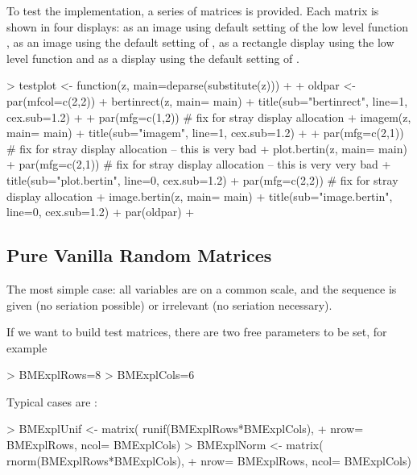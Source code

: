 \documentclass[nogin, dvips,12pt,a4paper,twoside]{amsart}
\begin{document}
To test the implementation, a series of matrices is provided. Each matrix is shown in four displays: as an image using default setting of the low level function , as an image using the default setting of , as a rectangle display using the low level function  and as a display using the default setting of .
\smallskip
\begin{Schunk}
\begin{Sinput}
> testplot <- function(z, main=deparse(substitute(z)))
+ {
+ 	oldpar <- par(mfcol=c(2,2))
+ 	bertinrect(z, main= main)
+ 	title(sub="bertinrect", line=1, cex.sub=1.2)
+ 
+ par(mfg=c(1,2)) # fix for stray display allocation
+ 	imagem(z, main= main)
+ 	title(sub="imagem", line=1, cex.sub=1.2)
+ 
+ par(mfg=c(2,1)) # fix for stray display allocation -- this is very bad
+ 	plot.bertin(z, main= main)
+ par(mfg=c(2,1)) # fix for stray display allocation -- this is very very bad
+ 	title(sub="plot.bertin", line=0, cex.sub=1.2)
+ par(mfg=c(2,2)) # fix for stray display allocation
+ 	image.bertin(z, main= main)
+ 	title(sub="image.bertin", line=0,  cex.sub=1.2)
+ 		par(oldpar)
+ }
\end{Sinput}
\end{Schunk}

\smallskip
\subsection{Pure Vanilla Random Matrices}
The most simple case: all variables are on a common scale, and the sequence is given (no seriation possible) or irrelevant (no seriation necessary).

If we want to build test matrices, there are two free parameters to be set, for example
\begin{Schunk}
\begin{Sinput}
> BMExplRows=8
> BMExplCols=6
\end{Sinput}
\end{Schunk}
Typical cases are :
\begin{Schunk}
\begin{Sinput}
> BMExplUnif  <- matrix( runif(BMExplRows*BMExplCols), 
+ 	nrow= BMExplRows, ncol= BMExplCols)
> BMExplNorm  <- matrix( rnorm(BMExplRows*BMExplCols), 
+ 	nrow= BMExplRows, ncol= BMExplCols)
\end{Sinput}
\end{Schunk}
\end{document}
